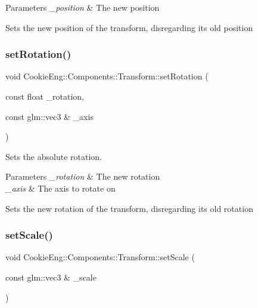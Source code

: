 \begin{DoxyParams}{Parameters}
{\em \+\_\+position} & The new position\\
\hline
\end{DoxyParams}
Sets the new position of the transform, disregarding its old position \mbox{\label{class_cookie_eng_1_1_components_1_1_transform_a382a16d437c34d7e345a60d11a9578b2}} 
\subsubsection{\texorpdfstring{set\+Rotation()}{setRotation()}}
{\footnotesize\ttfamily void Cookie\+Eng\+::\+Components\+::\+Transform\+::set\+Rotation (\begin{DoxyParamCaption}\item[{const float}]{\+\_\+rotation,  }\item[{const glm\+::vec3 \&}]{\+\_\+axis }\end{DoxyParamCaption})}



Sets the absolute rotation. 


\begin{DoxyParams}{Parameters}
{\em \+\_\+rotation} & The new rotation \\
\hline
{\em \+\_\+axis} & The axis to rotate on\\
\hline
\end{DoxyParams}
Sets the new rotation of the transform, disregarding its old rotation \mbox{\label{class_cookie_eng_1_1_components_1_1_transform_a6dadfac773418cc71d538c89219af0db}} 
\subsubsection{\texorpdfstring{set\+Scale()}{setScale()}}
{\footnotesize\ttfamily void Cookie\+Eng\+::\+Components\+::\+Transform\+::set\+Scale (\begin{DoxyParamCaption}\item[{const glm\+::vec3 \&}]{\+\_\+scale }\end{DoxyParamCaption})}



